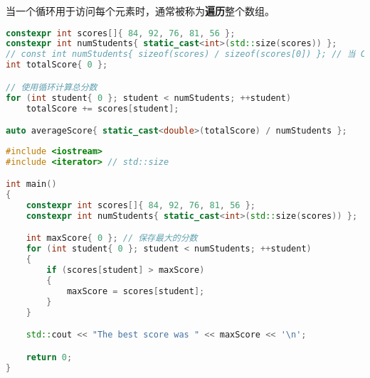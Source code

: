\documentclass[../../LearnCpp.tex]{subfiles}
\begin{document}

当一个循环用于访问每个元素时，通常被称为\textbf{遍历}整个数组。

\begin{lstlisting}[language=C++]
constexpr int scores[]{ 84, 92, 76, 81, 56 };
constexpr int numStudents{ static_cast<int>(std::size(scores)) };
// const int numStudents{ sizeof(scores) / sizeof(scores[0]) }; // 当 C++17 不可用时请使用这种方式
int totalScore{ 0 };

// 使用循环计算总分数
for (int student{ 0 }; student < numStudents; ++student)
    totalScore += scores[student];

auto averageScore{ static_cast<double>(totalScore) / numStudents };
\end{lstlisting}

\begin{lstlisting}[language=C++]
#include <iostream>
#include <iterator> // std::size

int main()
{
    constexpr int scores[]{ 84, 92, 76, 81, 56 };
    constexpr int numStudents{ static_cast<int>(std::size(scores)) };

    int maxScore{ 0 }; // 保存最大的分数
    for (int student{ 0 }; student < numStudents; ++student)
    {
        if (scores[student] > maxScore)
        {
            maxScore = scores[student];
        }
    }

    std::cout << "The best score was " << maxScore << '\n';

    return 0;
}
\end{lstlisting}
\end{document}
